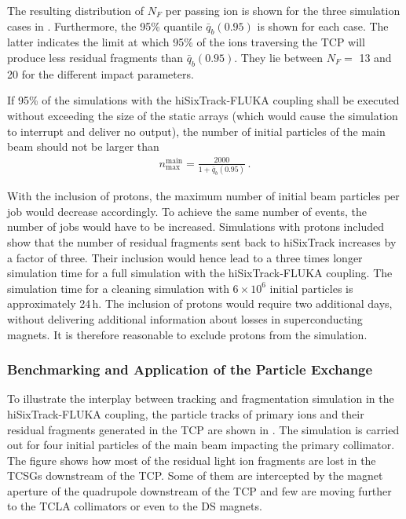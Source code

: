 The resulting distribution of $N_F$ per passing ion is shown for the three simulation cases in . Furthermore, the 95\% quantile $\bar{q}_b(0.95)$ is shown for each case. The latter indicates the limit at which 95\% of the ions traversing the TCP will produce less residual fragments than $\bar{q}_b(0.95)$. They lie between $N_F=$ 13 and 20 for the different impact parameters. 

If 95\% of the simulations with the hiSixTrack-FLUKA coupling shall be executed without exceeding the size of the static arrays (which would cause the simulation to interrupt and deliver no output), the number of initial particles of the main beam should not be larger than
%
\begin{align}
  n_\text{max}^\text{main} = \frac{2000}{1+\bar{q}_b(0.95)} \, .
\end{align}



With the inclusion of protons, the maximum number of initial beam particles per job would decrease accordingly. To achieve the same number of events, the number of jobs would have to be increased. Simulations with protons included show that the number of residual fragments sent back to hiSixTrack increases by a factor of three. Their inclusion would hence lead to a three times longer simulation time for a full simulation with the hiSixTrack-FLUKA coupling. The simulation time for a cleaning simulation with $6 \times 10^6$ initial \lead particles is approximately 24\,h. The inclusion of protons would require two additional days, without delivering additional information about losses in superconducting magnets. It is therefore reasonable to exclude protons from the simulation.


\subsubsection{Benchmarking and Application of the Particle Exchange}

To illustrate the interplay between tracking and fragmentation simulation in the hiSixTrack-FLUKA coupling, the particle tracks of primary ions and their residual fragments generated in the TCP are shown in . The simulation is carried out for four initial particles of the main \lead beam impacting the primary collimator. The figure shows how most of the residual light ion fragments  are lost in the TCSGs downstream of the TCP. Some of them are intercepted by the magnet aperture of the quadrupole downstream of the TCP and few are moving further to the TCLA collimators or even to the DS magnets. 

